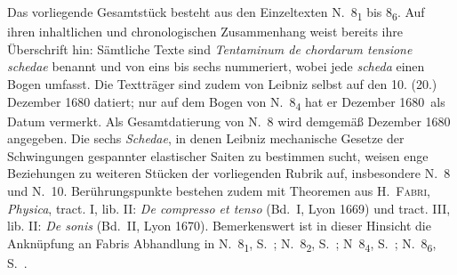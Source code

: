 %
%
%
%
\footnotesize 
\pstart
\noindent                
Das vorliegende Gesamtstück besteht aus den Einzeltexten N.~8\textsubscript{1} bis 8\textsubscript{6}.
Auf ihren inhaltlichen und chronologischen Zusammenhang weist bereits ihre Überschrift hin:
Sämtliche Texte sind \textit{Tentaminum de chordarum tensione schedae} benannt und von eins bis sechs nummeriert,
wobei jede \textit{scheda} einen Bogen umfasst.
Die Textträger sind zudem von Leibniz selbst auf den 10. (20.) Dezember 1680 datiert;
nur auf dem Bogen von N.~8\textsubscript{4} hat er \glqq Dezember 1680\grqq\ als Datum vermerkt.
Als Gesamtdatierung von N.~8 wird demgemäß Dezember 1680 angegeben.
\pend%
\pstart%
Die sechs \textit{Schedae}, in denen Leibniz mechanische Gesetze der Schwingungen gespannter elastischer Saiten zu bestimmen sucht,
weisen enge Beziehungen zu weiteren Stücken der vorliegenden Rubrik auf, insbesondere N.~8 und  N.~10. 
Berührungspunkte bestehen zudem mit Theoremen aus
\cite{00044}H.~\textsc{Fabri}, \textit{Physica},
tract. I, lib. II: \textit{De com\-pres\-so et tenso} (Bd.~I, Lyon 1669) %
und tract. III, lib. II: \textit{De sonis} (Bd.~II, Lyon 1670). %
Bemerkenswert ist in dieser Hinsicht die Anknüpfung an Fabris Abhandlung %
in
N.~8\textsubscript{1}, S.~;
N.~8\textsubscript{2}, S.~;
N~8\textsubscript{4}, S.~;
N.~8\textsubscript{6}, S.~. 
\pend
\newpage %
\normalsize